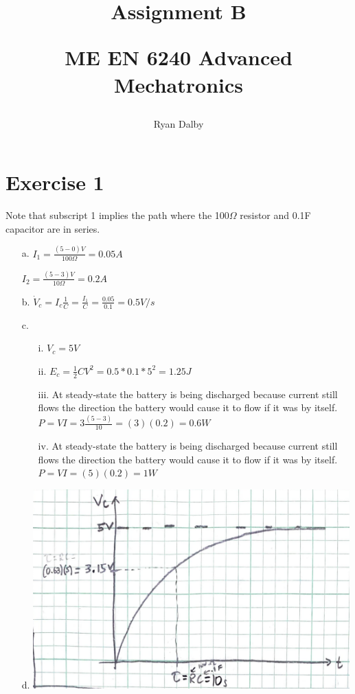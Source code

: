 \documentclass[12pt]{article}
\title{
    Assignment B

    \large{
        ME EN 6240 Advanced Mechatronics
    }  
}
\author{
        Ryan Dalby
}
\date{\displaydate{date}}
\begin{document}
\maketitle

\section*{Exercise 1}
Note that subscript 1 implies the path where the 100$\Omega$ resistor and 0.1F capacitor are in series.
\begin{enumerate}
    \item[a.]
    $I_1 = \frac{(5-0)V}{100\Omega} = 0.05 A$

    $I_2 = \frac{(5-3)V}{10\Omega} = 0.2 A$

    \item[b.]
    $\dot{V}_c = I_c \frac{1}{C} = \frac{I_1}{C} = \frac{0.05}{0.1} = 0.5 V/s$

    \item[c.]
    \begin{enumerate}
        \item[i.]
        $V_c = 5V$
        \item[ii.]
        $E_c = \frac{1}{2}CV^2 = 0.5*0.1*5^2 = 1.25 J$
        \item[iii.]
        At steady-state the battery is being discharged because current still flows the direction the battery would cause it to flow if it was by itself.
        $P = VI = 3 \frac{(5-3)}{10} = (3) (0.2) = 0.6 W$
        \item[iv.]
        At steady-state the battery is being discharged because current still flows the direction the battery would cause it to flow if it was by itself.
        $P = VI = (5) (0.2) = 1 W$
    
    \end{enumerate}

    \item[d.]
    \includegraphics[width=4.8in]{1d.png}
\end{enumerate}
\end{document}
